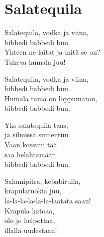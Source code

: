 \section{Salatequila}

Salatequila, vodka ja viina,\\
bibbedi babbedi buu.\\
Yhteen ne laitat ja mitä se on?\\
Tukeva humala juu! 

Salatequila, vodka ja viina,\\
bibbedi babbedi buu.\\
Humala tämä on loppumaton,\\
bibbedi babbedi buu.

Yks salatequila taas,\\
ja silmissä sumentuu.\\
Vaan kossuni tää \\
saa helähtämään\\
bibbedi babbedi buu.

Salamipitsa, kebabirulla,\\
krapularuokia juu, \\
la-la-la-la-la-la-laatata saan!\\
Krapula katoaa,\\
olo jo helpottaa,\\
illalla uudestaan!